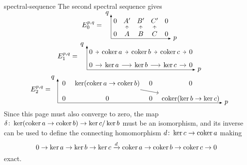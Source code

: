 \begin{example}{spectral-sequence}
    The second spectral sequence gives
    \[ \svg \begin{array}{c}
        E_0^{p, q} = \quad \begin{tikzcd}[row sep=0.5em, column sep=0.1em]
            0 & A' & B' & C' & 0 \\
            0 & A \arrow{u} & B \arrow{u} & C \arrow{u} & 0
        \end{tikzcd} \begin{tikzpicture}[overlay,remember picture]
            \draw[-latex] (-3.1, -0.6) -- (-3.1, 0.65);
            \draw[-latex] (-3.1, -0.6) -- (0, -0.6);
            \node at (0.2, -0.6) {$p$};
            \node at (-3.3, 0.7) {$q$};
        \end{tikzpicture} \\ \; \\
        E_1^{p, q} = \quad \begin{tikzcd}[row sep=0.5em, column sep=0.5em]
            0 \arrow{r} & \coker a \arrow{r} & \coker b \arrow{r} & \coker c \arrow{r} & 0 \\
            0 \arrow{r} & \ker a \arrow{r} & \ker b \arrow{r} & \ker c \arrow{r} & 0
        \end{tikzcd} \begin{tikzpicture}[overlay,remember picture]
            \draw[-latex] (-5.6, -0.6) -- (-5.6, 0.65);
            \draw[-latex] (-5.6, -0.6) -- (0, -0.6);
            \node at (0.2, -0.6) {$p$};
            \node at (-5.85, 0.7) {$q$};
        \end{tikzpicture} \\ \; \\
        E_2^{p, q} = \quad \begin{tikzcd}[row sep=0.5em, column sep=0.5em]
            0 & \ker(\coker a \to \coker b) \arrow{rrd} & 0 & 0 \\
            0 & 0 & 0 & \coker(\ker b \to \ker c)
        \end{tikzcd} \begin{tikzpicture}[overlay,remember picture]
            \draw[-latex] (-8.5, -0.6) -- (-8.5, 0.65);
            \draw[-latex] (-8.5, -0.6) -- (0, -0.6);
            \node at (0.2, -0.6) {$p$};
            \node at (-8.75, 0.7) {$q$};
        \end{tikzpicture}
    \end{array} \]
    Since this page must also converge to zero, the map $\delta \colon \ker(\operatorname{coker} a \to \operatorname{coker} b) \to \ker c / \ker b$ must be an isomorphism, and its inverse can be used to define the connecting homomorphism $d \colon \ker c \to \operatorname{coker} a$ making
    \[ 0 \to \ker a \rightarrow \ker b \rightarrow \ker c \xrightarrow{d} \operatorname{coker} a \rightarrow \operatorname{coker} b \rightarrow \operatorname{coker} c \to 0 \]
    exact.
\end{example}

